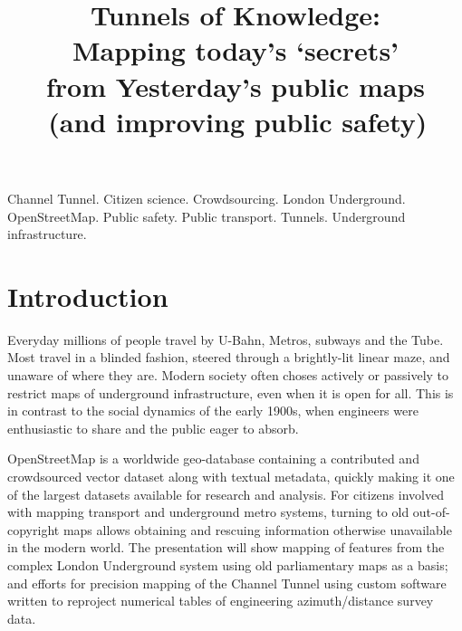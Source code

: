 \documentclass[conference,a4paper]{IEEEtran}
\begin{document}
\title{\hphantom{:}Tunnels of Knowledge:\\
\vspace{0.7em}
{\Large \hphantom{'}Mapping today's `secrets'\\\vspace{-0.6em} from Yesterday's public maps}\\
{\large *\,(and improving public safety)\hphantom{\,*}}}
\author{%
  \texorpdfstring{%
}{Paul Sladen}}
\maketitle

\begin{IEEEkeywords}
Channel Tunnel.
Citizen science.
Crowdsourcing.
London Underground.
OpenStreetMap.
Public safety.
Public transport.
Tunnels.
Underground infrastructure.
\end{IEEEkeywords}

\IEEEpeerreviewmaketitle

\section{Introduction}
Everyday millions of people travel by U-Bahn, Metros, subways and the
Tube. Most travel in a blinded fashion, steered through a brightly-lit
linear maze, and unaware of where they are. Modern society often
choses actively or passively to restrict maps of underground
infrastructure, even when it is open for all. This is in contrast to
the social dynamics of the early 1900s, when engineers were
enthusiastic to share and the public eager to absorb.

OpenStreetMap\cite{openstreetmap} is a worldwide geo-database containing a contributed and
crowdsourced vector dataset along with textual metadata, quickly making it one
of the largest datasets available for research and analysis.\cite{street-2006} For
citizens involved with mapping transport and underground metro
systems, turning to old out-of-copyright maps allows obtaining and
rescuing information otherwise unavailable in the modern world. The
presentation will show mapping of features from the complex London
Underground system using old parliamentary maps as a basis; and
efforts for precision mapping of the Channel Tunnel using custom
software written to reproject numerical tables of engineering
azimuth/distance survey data.
\end{document}
